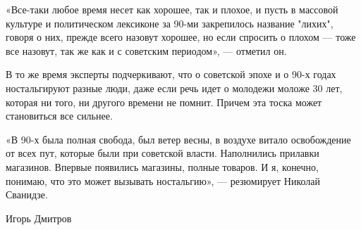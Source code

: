 «Все-таки любое время несет как хорошее, так и плохое, и пусть в массовой
культуре и политическом лексиконе за 90-ми закрепилось название "лихих", говоря
о них, прежде всего назовут хорошее, но если спросить о плохом — тоже все
назовут, так же как и с советским периодом», — отметил он.

В то же время эксперты подчеркивают, что о советской эпохе и о 90-х годах
ностальгируют разные люди, даже если речь идет о молодежи моложе 30 лет,
которая ни того, ни другого времени не помнит. Причем эта тоска может
становиться все сильнее.

«В 90-х была полная свобода, был ветер весны, в воздухе витало освобождение от
всех пут, которые были при советской власти. Наполнились прилавки магазинов.
Впервые появились магазины, полные товаров. И я, конечно, понимаю, что это
может вызывать ностальгию», — резюмирует Николай Сванидзе.

Игорь Дмитров
